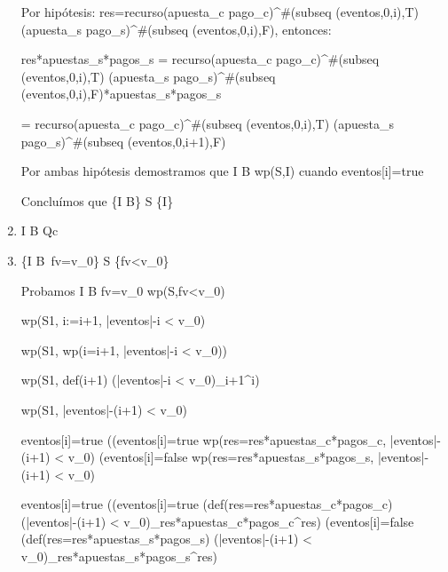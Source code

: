 \documentclass[10pt,a4paper]{article}
\begin{document}
\begin{enumerate}
		Por hipótesis: res=recurso(apuesta_c pago_c)^{\#(subseq (eventos,0,i),T)} (apuesta_s pago_s)^{\#(subseq (eventos,0,i),F)}, \hspace{3} entonces: 
		\vspace{2mm}
	
		res*apuestas_s*pagos_s = recurso(apuesta_c pago_c)^{\#(subseq (eventos,0,i),T)} (apuesta_s pago_s)^{\#(subseq (eventos,0,i),F)}*apuestas_s*pagos_s
		\vspace{2mm}
	
		= recurso(apuesta_c pago_c)^{\#(subseq (eventos,0,i),T)} (apuesta_s pago_s)^{\#(subseq (eventos,0,i+1),F)}
		\vspace{2mm}
	
		Por ambas hipótesis demostramos que I \wedge B \implica wp(S,I) \hspace{3} cuando \hspace{3} eventos[i]=true
		\vspace{2mm}
	
		Concluímos que {\{I \wedge B\} S \{I\}}
		\vspace{2mm}
	
		\item I \wedge \neg B \implica Qc
		
		\item {\{I \wedge B\ \wedge fv=v_0\} \hspace{2} S \hspace{2} \{fv<v_0\}}
		\vspace{2mm}
	
		Probamos I \wedge B \wedge fv=v_0 \implica wp(S,fv<v_0)
		\vspace{2mm}
	
		wp(S1, i:=i+1, |eventos|-i < v_0)
		\vspace{2mm}
	
		\equiv wp(S1, wp(i=i+1, |eventos|-i < v_0))
		\vspace{2mm}
	
		\equiv wp(S1, def(i+1) \yLuego (|eventos|-i < v_0)_{i+1}^i)
		\vspace{2mm}
	
		\equiv wp(S1, |eventos|-(i+1) < v_0)
		\vspace{2mm}
	
		\equiv eventos[i]=true \yLuego ((eventos[i]=true \wedge wp(res=res*apuestas_c*pagos_c, |eventos|-(i+1) < v_0) \vee (eventos[i]=false \wedge wp(res=res*apuestas_s*pagos_s, |eventos|-(i+1) < v_0)
		\vspace{2mm}
	
		\equiv eventos[i]=true \yLuego ((eventos[i]=true \wedge (def(res=res*apuestas_c*pagos_c) \yLuego (|eventos|-(i+1) < v_0)_{res*apuestas_c*pagos_c}^{res}) \vee (eventos[i]=false \wedge (def(res=res*apuestas_s*pagos_s) \yLuego (|eventos|-(i+1) < v_0)_{res*apuestas_s*pagos_s}^{res})
		\vspace{2mm}
	

\end{enumerate}
\end{document}
